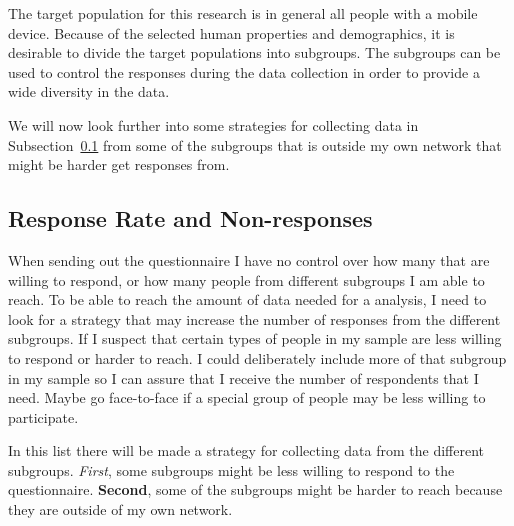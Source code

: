     The target population for this research is in general all people with a mobile device. Because of the selected human properties and demographics, it is desirable to divide the target populations into subgroups. The subgroups can be used to control the responses during the data collection in order to provide a wide diversity in the data. 


    We will now look further into some strategies for collecting data in Subsection~\ref{sec:response} from some of the subgroups that is outside my own network that might be harder get responses from.

  \subsection{Response Rate and Non-responses} \label{sec:response}

    When sending out the questionnaire I have no control over how many that are willing to respond, or how many people from different subgroups I am able to reach. To be able to reach the amount of data needed for a analysis, I need to look for a strategy that may increase the number of responses from the different subgroups. If I suspect that certain types of people in my sample are less willing to respond or harder to reach. I could deliberately include more of that subgroup in my sample so I can assure that I receive the number of respondents that I need. Maybe go face-to-face if a special group of people may be less willing to participate. 

    In this list there will be made a strategy for collecting data from the  different subgroups. {\it First}, some subgroups might be less willing to respond to the questionnaire. {\bf Second}, some of the subgroups might be harder to reach because they are outside of my own network. 

